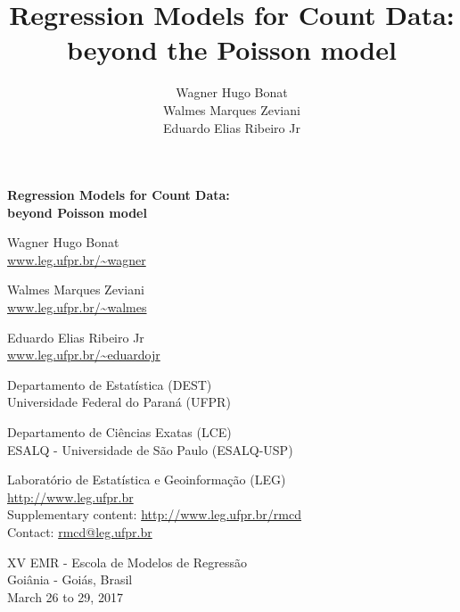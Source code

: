 \documentclass[9pt,a5paper,]{book}
\title{Regression Models for Count Data: beyond the Poisson model}
\author{Wagner Hugo Bonat \\ Walmes Marques Zeviani \\ Eduardo Elias Ribeiro Jr}
\date{}
\theoremstyle{definition}
\theoremstyle{definition}
\theoremstyle{remark}
\begin{document}
\maketitle

\thispagestyle{empty}
\cleardoublepage
\thispagestyle{empty}


\begin{flushleft}
  \Large \bf
  Regression Models for Count Data:\\
  beyond Poisson model
\end{flushleft}
\vspace*{1.5em}

\begin{flushleft}
Wagner Hugo Bonat\footnotemark[1] \footnotemark[3]\\
\url{www.leg.ufpr.br/~wagner}

Walmes Marques Zeviani\footnotemark[1] \footnotemark[3]\\
\url{www.leg.ufpr.br/~walmes}

Eduardo Elias Ribeiro Jr\footnotemark[2] \footnotemark[3]\\
\url{www.leg.ufpr.br/~eduardojr}
\end{flushleft}
\vspace*{2em}


\footnotemark[1]Departamento de Estatística (DEST)\\
\hspace*{1.5mm}Universidade Federal do Paraná (UFPR)

\footnotemark[2]Departamento de Ciências Exatas (LCE)\\
\hspace*{1.5mm}ESALQ - Universidade de São Paulo (ESALQ-USP)

\footnotemark[3]Laboratório de Estatística e Geoinformação (LEG)\\
\hspace*{1.5mm}\url{http://www.leg.ufpr.br}\\

Supplementary content: \url{http://www.leg.ufpr.br/rmcd}\\
Contact: \url{rmcd@leg.ufpr.br}
\vspace*{\fill}

\begin{center}
XV EMR - Escola de Modelos de Regressão\\
Goiânia - Goiás, Brasil\\
March 26 to 29, 2017
\end{center}
\end{document}
